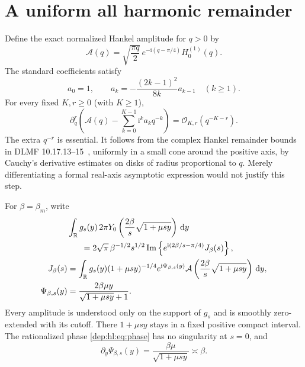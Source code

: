 \documentclass[11pt]{article}
\theoremstyle{definition}\newtheorem{definition}[theorem]{Definition}
\theoremstyle{remark}\newtheorem{remark}[theorem]{Remark}
\newcommand{\OO}{\mathcal O}
\newcommand{\ii}{\mathrm i}
\newcommand{\dd}{\,\mathrm d}
\newcommand{\RR}{\mathbb R}
\DeclareMathOperator{\Impart}{Im}
\begin{document}
\section{A uniform all harmonic remainder}\label{dep:hl:sec:uniform}
Define the exact normalized Hankel amplitude for $q>0$ by
\[
 \mathcal A(q)=\sqrt{\frac{\pi q}{2}}\,
      e^{-\ii(q-\pi/4)}H_0^{(1)}(q).
\]
The standard coefficients satisfy
\begin{equation}\label{dep:hl:eq:ak}
 a_0=1,\qquad a_k=-\frac{(2k-1)^2}{8k}a_{k-1}\quad(k\ge1).
\end{equation}
For every fixed $K,r\ge0$ (with $K\ge1$),
\begin{equation}\label{dep:hl:eq:symbol}
 \partial_q^r\left(\mathcal A(q)-\sum_{k=0}^{K-1}\ii^ka_kq^{-k}\right)
                 =\OO_{K,r}(q^{-K-r}).
\end{equation}
The extra $q^{-r}$ is essential. It follows from the complex Hankel
remainder bounds in DLMF 10.17.13--15~\cite{dlmfH}, uniformly in a
small cone around the positive axis, by Cauchy's derivative estimates
on disks of radius proportional to $q$. Merely differentiating a
formal real-axis asymptotic expression would not justify this step.

For $\beta=\beta_m$, write
\begin{align}\label{dep:hl:eq:Jidentity}
 &\int_\RR g_s(y)\,2\pi Y_0
       \left(\frac{2\beta}{s}\sqrt{1+\mu sy}\right)\dd y\notag\\
 &\hspace{6mm}=2\sqrt\pi\,\beta^{-1/2}s^{1/2}
       \Impart\left\{e^{\ii(2\beta/s-\pi/4)}J_\beta(s)\right\},\\
 J_\beta(s)&=\int_\RR g_s(y)(1+\mu sy)^{-1/4}
 e^{\ii\Psi_{\beta,s}(y)}
 \mathcal A\left(\frac{2\beta}{s}\sqrt{1+\mu sy}\right)\dd y,\label{dep:hl:eq:J}\\
 \Psi_{\beta,s}(y)&=\frac{2\beta\mu y}{\sqrt{1+\mu sy}+1}.
 \label{dep:hl:eq:phase}
\end{align}
Every amplitude is understood only on the support of $g_s$ and is
smoothly zero-extended with its cutoff. There
$1+\mu sy$ stays in a fixed positive compact interval. The rationalized
phase \eqref{dep:hl:eq:phase} has no singularity at $s=0$, and
\begin{equation}\label{dep:hl:eq:gradient}
 \partial_y\Psi_{\beta,s}(y)=\frac{\beta\mu}{\sqrt{1+\mu sy}}
                              \asymp\beta.
\end{equation}
\end{document}
